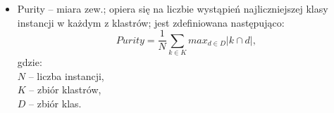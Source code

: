\begin{itemize}
{                    $b$ -- liczba par instancji przypisanych do różnych klastrów,\\
                    $N$ -- liczba instancji.}
      \item{Purity -- miara zew.; opiera się na liczbie wystąpień najliczniejszej klasy instancji w każdym z klastrów; jest zdefiniowana następująco:
                      $$ Purity = \frac{1}{N} \sum_{k \in K} max_{d \in D} | k \cap d |,$$
                      gdzie:\\
                      $N$ -- liczba instancji,\\
                      $K$ -- zbiór klastrów,\\
                      $D$ -- zbiór klas.}
    \end{itemize}

